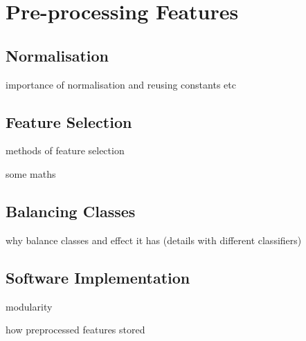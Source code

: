 \section{Pre-processing Features}
\label{sec:pl-featpreproc}

    \subsection{Normalisation}
    \label{subsec:pl-featpreproc-norm}
        \begin{sitemize}
            \item{importance of normalisation and reusing constants etc}
        \end{sitemize}

    \subsection{Feature Selection}
    \label{subsec:pl-featpreproc-sel}
        \begin{sitemize}
            \item{methods of feature selection}
            \item{some maths}
        \end{sitemize}
        
    
    \subsection{Balancing Classes}
    \label{subsec:pl-featpreproc-bal}
        \begin{sitemize}
            \item{why balance classes and effect it has (details with different classifiers)}
        \end{sitemize}
    
    \subsection{Software Implementation}
    \label{subsec:pl-featpreproc-software}
        \begin{sitemize}
            \item{modularity}
            \item{how preprocessed features stored}
        \end{sitemize}
    